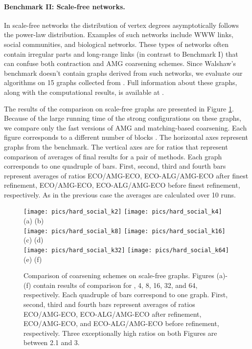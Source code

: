 \documentclass{llncs}
\begin{document}
\paragraph{Benchmark II: Scale-free networks.} In scale-free networks the distribution of vertex degrees asymptotically follows the power-law distribution. Examples of such networks include WWW links, social communities, and biological networks. 
These types of networks often contain irregular parts and long-range links (in contrast to Benchmark I) that can confuse both contraction and AMG coarsening schemes. 
Since Walshaw's benchmark doesn't contain graphs derived from such networks, we evaluate our algorithms on 15 graphs collected from \cite{dimacs10,snap}. Full information about these graphs, along with the computational results, is available at \cite{hardpart-site}.
\par The results of the comparison on scale-free graphs are presented in Figure \ref{fig:scalefree}. 
Because of the large running time of the strong configurations on these graphs, we compare only the fast versions of AMG and matching-based coarsening. 
Each figure corresponds to a different number of blocks . The horizontal axes represent graphs from the benchmark. The vertical axes are for ratios that represent comparison of averages of final results for a pair of methods. Each graph corresponds to one quadruple of bars. First, second, third and fourth bars represent averages of ratios ECO/AMG-ECO, ECO-ALG/AMG-ECO after finest refinement, ECO/AMG-ECO, ECO-ALG/AMG-ECO before finest refinement, respectively. As in the previous case the averages are calculated over 10 runs.
\begin{figure}
\texttt{[image: pics/hard\_social\_k2]}  \hspace{-1cm}
\texttt{[image: pics/hard\_social\_k4]}\\
 \hspace{4cm} (a)  \hspace{6cm} (b)  \\
\texttt{[image: pics/hard\_social\_k8]}  \hspace{-1cm}
\texttt{[image: pics/hard\_social\_k16]}\\
 \hspace{4cm} (c)  \hspace{6cm} (d)  \\
\texttt{[image: pics/hard\_social\_k32]}  \hspace{-1cm}
\texttt{[image: pics/hard\_social\_k64]}\\
 \hspace{4cm} (e)  \hspace{6cm} (f)  \\
\caption{Comparison of coarsening schemes on scale-free graphs. Figures (a)-(f) contain results of comparison for , 4, 8, 16, 32, and 64, respectively. Each quadruple of bars correspond to one graph. First, second, third and fourth bars represent averages of ratios ECO/AMG-ECO, ECO-ALG/AMG-ECO after refinement, ECO/AMG-ECO, and ECO-ALG/AMG-ECO before refinement, respectively. Three exceptionally high ratios on both Figures are between 2.1 and 3.}\label{fig:scalefree} 
\end{figure}
\end{document}
